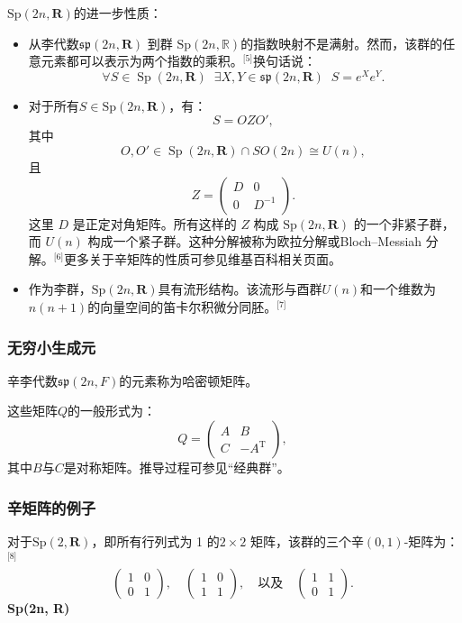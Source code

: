 $\mathrm{Sp}(2n, \mathbf{R})$的进一步性质：
\begin{itemize}
\item 从李代数$\mathfrak{sp}(2n, \mathbf{R})$ 到群 $\mathrm{Sp}(2n, \mathbb{R})$的指数映射不是满射。然而，该群的任意元素都可以表示为两个指数的乘积。\(^\text{[5]}\)换句话说：
   $$
   \forall S \in \operatorname{Sp}(2n,\mathbf{R}) \;\; \exists X, Y \in \mathfrak{sp}(2n,\mathbf{R}) \;\; S = e^{X} e^{Y}.~
   $$
\item 对于所有$S \in \mathrm{Sp}(2n, \mathbf{R})$，有：
   $$
   S = O Z O',~
   $$
   其中
   $$
   O, O' \in \operatorname{Sp}(2n, \mathbf{R}) \cap SO(2n) \cong U(n),~
   $$
   且
   $$
   Z = \begin{pmatrix} D & 0 \\ 0 & D^{-1} \end{pmatrix}.~
   $$
   这里 $D$ 是正定对角矩阵。所有这样的 $Z$ 构成 $\mathrm{Sp}(2n, \mathbf{R})$ 的一个非紧子群，而 $U(n)$ 构成一个紧子群。这种分解被称为欧拉分解或Bloch–Messiah 分解。\(^\text{[6]}\)更多关于辛矩阵的性质可参见维基百科相关页面。
\item 作为李群，$\mathrm{Sp}(2n, \mathbf{R})$具有流形结构。该流形与酉群$U(n)$和一个维数为$n(n+1)$的向量空间的笛卡尔积微分同胚。\(^\text{[7]}\)
\end{itemize}
\subsubsection{无穷小生成元}
辛李代数$\mathfrak{sp}(2n, F)$的元素称为哈密顿矩阵。

这些矩阵$Q$的一般形式为：
$$
Q = 
\begin{pmatrix}
A & B \\
C & -A^{\mathrm{T}}
\end{pmatrix},~
$$
其中$B$与$C$是对称矩阵。推导过程可参见“经典群”。
\subsubsection{辛矩阵的例子}
对于$\mathrm{Sp}(2, \mathbf{R})$，即所有行列式为 1 的$2 \times 2$ 矩阵，该群的三个辛$(0,1)$-矩阵为：\(^\text{[8]}\)
$$
\begin{pmatrix}
1 & 0 \\
0 & 1
\end{pmatrix}, \quad
\begin{pmatrix}
1 & 0 \\
1 & 1
\end{pmatrix}, \quad
\text{以及} \quad
\begin{pmatrix}
1 & 1 \\
0 & 1
\end{pmatrix}.~
$$
\textbf{Sp(2n, R)}

